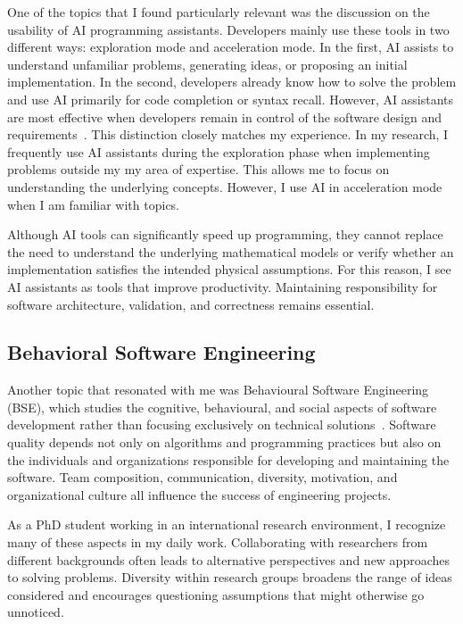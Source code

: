 \documentclass{article}
\begin{document}
One of the topics that I found particularly relevant was the discussion on the usability of AI programming assistants. 
Developers mainly use these tools in two different ways: exploration mode and acceleration mode. 
In the first, AI assists to understand unfamiliar problems, generating ideas, or proposing an initial implementation. 
In the second, developers already know how to solve the problem and use AI primarily for code completion or syntax recall. 
However, AI assistants are most effective when developers remain in control of the software design and requirements~\cite{Liang2024}.
This distinction closely matches my experience. 
In my research, I frequently use AI assistants during the exploration phase when implementing problems outside my my area of expertise. 
This allows me to focus on understanding the underlying concepts. 
However, I use AI in acceleration mode when I am familiar with topics. 

Although AI tools can significantly speed up programming, they cannot replace the need to understand the underlying mathematical models or verify whether an implementation satisfies the intended physical assumptions. 
For this reason, I see AI assistants as tools that improve productivity. 
Maintaining responsibility for software architecture, validation, and correctness remains essential.

\subsection{Behavioral Software Engineering}

Another topic that resonated with me was Behavioural Software Engineering (BSE), which studies the cognitive, behavioural, and social aspects of software development rather than focusing exclusively on technical solutions~\cite{Lenberg2014}. 
Software quality depends not only on algorithms and programming practices but also on the individuals and organizations responsible for developing and maintaining the software. 
Team composition, communication, diversity, motivation, and organizational culture all influence the success of engineering projects.

As a PhD student working in an international research environment, I recognize many of these aspects in my daily work. 
Collaborating with researchers from different backgrounds often leads to alternative perspectives and new approaches to solving problems. 
Diversity within research groups broadens the range of ideas considered and encourages questioning assumptions that might otherwise go unnoticed. 
\end{document}
